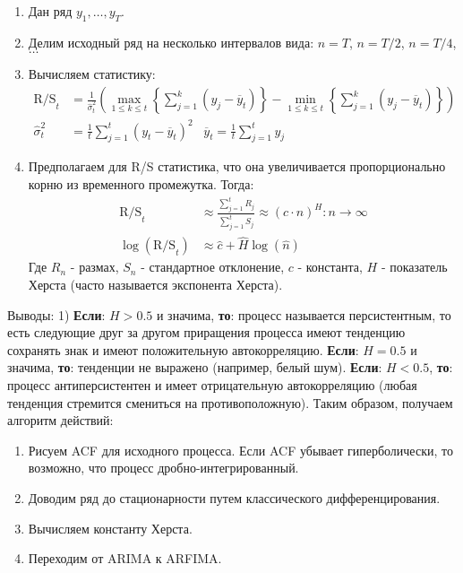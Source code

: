 \begin{enumerate}
	\item Дан ряд $y_1, \ldots, y_{T}$.
	\item Делим исходный ряд на несколько интервалов вида: $n = T$, $n = T / 2$, $n = T / 4$, $\ldots$
	\item Вычисляем статистику:
	\begin{equation}
		\begin{split}
			\text{R/S}_t & = \frac{1}{\hat{\sigma}^2_t} \left(\max_{1 \le k \le t} \left\{\sum_{j = 1}^k (y_j - \overline{y}_t)\right\} - \min_{1 \le k \le t} \left\{\sum_{j = 1}^k (y_j - \overline{y}_t)\right\}\right)\\
			\hat{\sigma}^2_t & = \frac{1}{t} \sum_{j = 1}^t (y_t - \overline{y}_t)^2 \;\;\; \overline{y}_t = \frac{1}{t} \sum_{j = 1}^t y_j
		\end{split}		
	\end{equation}
	\item Предполагаем для R/S статистика, что она увеличивается пропорционально корню из временного промежутка. Тогда:
	\begin{equation}
		\begin{split}
			\text{R/S}_t & \approx \frac{\sum_{j = 1}^t R_j}{\sum_{j = 1}^t S_j} \approx (c \cdot n)^H: n \to \infty\\
			\log\left(\text{R/S}_t\right) & \approx \hat{c} + \hat{H} \log(\hat{n})
		\end{split}
	\end{equation}
	Где $R_n$ - размах, $S_n$ - стандартное отклонение, $c$ - константа, $H$ - показатель Херста (часто называется экспонента Херста).
\end{enumerate}
Выводы: 1) \textbf{Если}: $H > 0.5$ и значима, \textbf{то}: процесс называется персистентным, то есть следующие друг за другом приращения процесса имеют тенденцию сохранять знак и имеют положительную автокорреляцию. \textbf{Если}: $H = 0.5$ и значима, \textbf{то}: тенденции не выражено (например, белый шум). \textbf{Если}: $H < 0.5$, \textbf{то}: процесс антиперсистентен и имеет отрицательную автокорреляцию (любая тенденция стремится смениться на противоположную). Таким образом, получаем алгоритм действий:
\begin{enumerate}
	\item Рисуем ACF для исходного процесса. Если ACF убывает гиперболически, то возможно, что процесс дробно-интегрированный.
	\item Доводим ряд до стационарности путем классического дифференцирования.
	\item Вычисляем константу Херста.
	\item Переходим от ARIMA к ARFIMA.
\end{enumerate}
